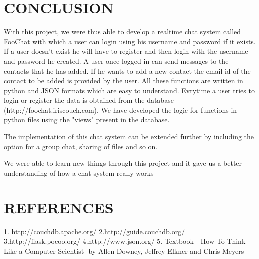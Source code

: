 \documentclass[a4paper,11pt,conference]{IEEEtran}
\begin{document}
\section{CONCLUSION}
		With this project, we were thus able to develop a realtime chat system called FooChat with which a user can login using his username and password if it exists. If a user doesn't exist he will have to register and then login with the username and password he created. A user once logged in can send messages to the contacts that he has added. If he wants to add a new contact the email id of the contact to be added is provided by the user. All these functions are written in python and JSON formats which are easy to understand. Evrytime a user tries to login or register the data is obtained from the database (http://foochat.iriscouch.com).  We have developed the logic for functions in python files using the "views" present in the database.
		
		The implementation of this chat system can be extended further by including the option for a group chat, sharing of files and so on.
		
		We were able to learn new things through this project and it gave us a better understanding of how a chat system really works


\section{REFERENCES}
		1. http://couchdb.apache.org/
		2.http://guide.couchdb.org/
		3.http://flask.pocoo.org/
		4.http://www.json.org/
		5. Textbook -  How To Think Like a Computer Scientist- by Allen Downey,  Jeffrey Elkner and Chris Meyers
\end{document}
